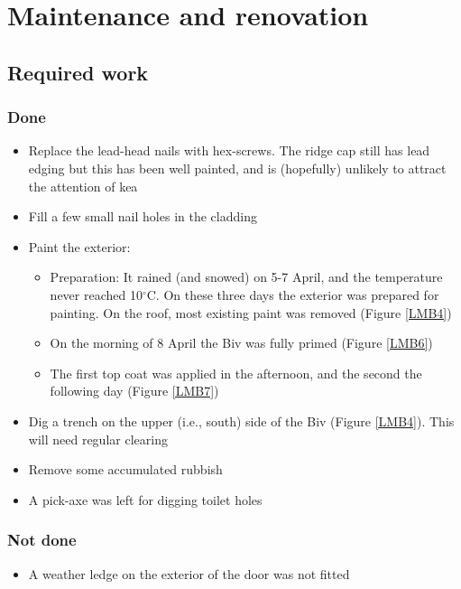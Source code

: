 \documentclass[12pt]{article} %
\begin{document}
\section{Maintenance and renovation}

\subsection{Required work}

\subsubsection{Done}

\begin{itemize}
 \item Replace the lead-head nails with hex-screws.  The ridge cap still has lead edging but this has been well painted, and is (hopefully) unlikely to attract the attention of kea
 \item Fill a few small nail holes in the cladding
 \item Paint the exterior:
 \begin{itemize}
  \item Preparation: It rained (and snowed) on 5-7 April, and the temperature never reached 10$^{\circ}$C.  On these three days the exterior was prepared for painting.  On the roof, most existing paint was removed (Figure \ref{LMB4})
  \item On the morning of 8 April the Biv was fully primed (Figure \ref{LMB6})
  \item The first top coat was applied in the afternoon, and the second the following day (Figure \ref{LMB7})
 \end{itemize}
 \item Dig a trench on the upper (i.e., south) side of the Biv (Figure \ref{LMB4}).  This will need regular clearing
 \item Remove some accumulated rubbish
 \item A pick-axe was left for digging toilet holes
\end{itemize}

\subsubsection{Not done}
\begin{itemize}
 \item A weather ledge on the exterior of the door was not fitted
\end{itemize}
\end{document}
